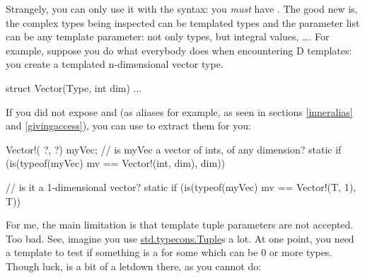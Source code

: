 Strangely, you can only use it with the  syntax: you \emph{must} have . The good new is, the complex types being inspected can be templated types and the parameter list can be any template parameter: not only types, but integral values, \ldots.
For example, suppose you do what everybody does when encountering D templates: you create a templated  n-dimensional vector type.

\begin{dcode}
struct Vector(Type, int dim) { ... }
\end{dcode}

If you did not expose  and  (as aliases for example, as seen in sections \ref{inneralias} and \ref{givingaccess}), you can use  to extract them for you:

\begin{dcode}
Vector!( ?, ?) myVec;
// is myVec a vector of ints, of any dimension?
static if (is(typeof(myVec) mv == Vector!(int, dim), dim))

// is it a 1-dimensional vector?
static if (is(typeof(myVec) mv == Vector!(T, 1), T))
\end{dcode}



For me, the main limitation is that template tuple parameters are not accepted. Too bad. See, imagine you use \href{www.d-programming-language.org/phobos/std_typecons.html#Tuple}{std.typecons.Tuple}s a lot. At one point, you need a template to test if something is a  for some  which can be 0 or more types. Though luck,  is a bit of a letdown there, as you cannot do:

\begin{dcode}
template isTuple(T)
{
    static if (is(T tup == Tuple!(InnerTypes), InnerTypes...)
(...)                                          ^^^^^^^^^^^^^
\end{dcode}

